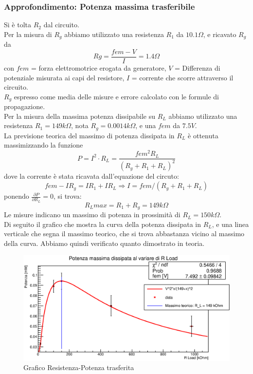 \subsubsection{Approfondimento: Potenza massima trasferibile}
    Si è tolta $R_2$ dal circuito.\\
    Per la misura di $R_g$ abbiamo utilizzato una resistenza $R_1$ da $10.1 \Omega$, e ricavato $R_g$ da
    $$Rg = \frac{fem-V}{I} = 1.4 \Omega $$
    con $fem$ = forza elettromotrice erogata da generatore,
    $V$ = Differenza di potenziale misurata ai capi del resistore, $I$ = corrente che scorre attraverso il circuito.\\
    $R_g$ espresso come media delle misure e errore calcolato con le formule di propagazione.\\
%
    
%
    Per la misura della massima potenza dissipabile su $R_L$ abbiamo utilizzato una resistenza $R_1= 149 k\Omega$, nota $R_g = 0.0014 k\Omega$, e una $fem$ da $7.5 V$. \\
    La previsione teorica del massimo di potenza dissipata in $R_L$ è ottenuta massimizzando la funzione
    $$P=I^2\cdot R_{L} = \frac{fem^2 R_L}{(R_g + R_1 + R_L)^2} $$
    dove la corrente è stata ricavata dall'equazione del circuto:   
    $$fem- IR_g = IR_1 + I R_L \Rightarrow I = fem / (R_g+R_1+R_L)$$
    ponendo $\frac{\partial P}{\partial R_L} = 0$, si trova:
    $$ R_L max = R_1+R_g = 149  k\Omega$$
%
    Le misure indicano un massimo di potenza in prossimità di $R_L = 150 k\Omega$.\\
    Di seguito il grafico che mostra la curva della potenza dissipata in $R_L$, e una linea verticale che segna il massimo teorico, che si trova abbastanza vicino al massimo della curva. Abbiamo quindi verificato quanto dimostrato in teoria.\\   
    \begin{figure}[H]
    \centering
    \includegraphics[scale=.7]{Grafici/C1_P2_maxPower.eps}
    \caption{Grafico Resistenza-Potenza trasferita}
    \label{fig:C1_P2_maxPower}
    \end{figure}
    

    
    
    
